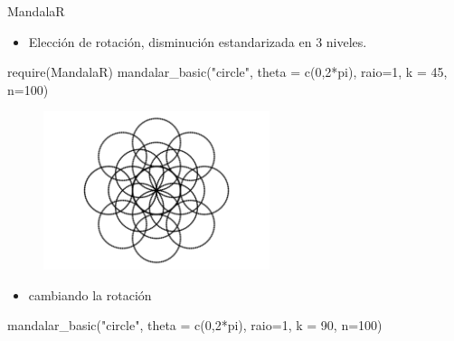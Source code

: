 \documentclass[
  ignorenonframetext,
]{beamer}
\newenvironment{Shaded}{\begin{snugshade}}{\end{snugshade}}
\newcommand{\AttributeTok}[1]{\textcolor[rgb]{0.40,0.45,0.13}{#1}}
\newcommand{\DecValTok}[1]{\textcolor[rgb]{0.68,0.00,0.00}{#1}}
\newcommand{\FunctionTok}[1]{\textcolor[rgb]{0.28,0.35,0.67}{#1}}
\newcommand{\NormalTok}[1]{\textcolor[rgb]{0.00,0.23,0.31}{#1}}
\newcommand{\SpecialCharTok}[1]{\textcolor[rgb]{0.37,0.37,0.37}{#1}}
\newcommand{\StringTok}[1]{\textcolor[rgb]{0.13,0.47,0.30}{#1}}
\providecommand{\tightlist}{%
  \setlength{\itemsep}{0pt}\setlength{\parskip}{0pt}}\usepackage{longtable,booktabs,array}
\begin{document}
\begin{frame}[fragile]{MandalaR}
\protect\hypertarget{mandalar}{}
\begin{itemize}
\tightlist
\item
  Elección de rotación, disminución estandarizada en 3 niveles.
\end{itemize}

\begin{Shaded}
\begin{Highlighting}[]
\FunctionTok{require}\NormalTok{(MandalaR)}
\FunctionTok{mandalar\_basic}\NormalTok{(}\StringTok{"circle"}\NormalTok{, }\AttributeTok{theta =} \FunctionTok{c}\NormalTok{(}\DecValTok{0}\NormalTok{,}\DecValTok{2}\SpecialCharTok{*}\NormalTok{pi), }\AttributeTok{raio=}\DecValTok{1}\NormalTok{, }\AttributeTok{k =} \DecValTok{45}\NormalTok{, }\AttributeTok{n=}\DecValTok{100}\NormalTok{)}
\end{Highlighting}
\end{Shaded}

\begin{figure}

{\centering \includegraphics[width=2.60417in,height=\textheight]{Teste_quarto_files/figure-beamer/unnamed-chunk-21-1.pdf}

}

\end{figure}

\begin{itemize}
\tightlist
\item
  cambiando la rotación
\end{itemize}

\begin{Shaded}
\begin{Highlighting}[]
\FunctionTok{mandalar\_basic}\NormalTok{(}\StringTok{"circle"}\NormalTok{, }\AttributeTok{theta =} \FunctionTok{c}\NormalTok{(}\DecValTok{0}\NormalTok{,}\DecValTok{2}\SpecialCharTok{*}\NormalTok{pi), }\AttributeTok{raio=}\DecValTok{1}\NormalTok{, }\AttributeTok{k =} \DecValTok{90}\NormalTok{, }\AttributeTok{n=}\DecValTok{100}\NormalTok{)}
\end{Highlighting}
\end{Shaded}


\end{frame}
\end{document}
